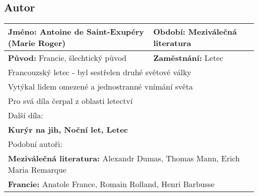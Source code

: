 \subsection*{Autor}
\begin{tabularx}{\linewidth}{l|l}
    \textbf{Jméno:} Antoine de Saint-Exupéry (Marie Roger) & \textbf{Období:} Meziválečná literatura       \\
    \hline
    \textbf{Původ:} Francie, šlechtický původ              & \textbf{Zaměstnání:} Letec                    \\
    \hline
    \multicolumn{2}{l}{Francouzský letec - byl sestřelen druhé světové války}                              \\
    \multicolumn{2}{l}{Vytýkal lidem omezené a jednostranné vnímání světa}                                 \\
    \multicolumn{2}{l}{Pro svá díla čerpal z oblasti letectví}                                             \\
    \hline
    \multicolumn{2}{l}{Další díla:}                                                                        \\
    \multicolumn{2}{l}{\textbf{Kurýr na jih, Noční let, Letec}}                                            \\
    \hline
    \multicolumn{2}{l}{Podobní autoři:}                                                                    \\
    \multicolumn{2}{l}{\textbf{Meziválečná literatura:} Alexandr Dumas, Thomas Mann, Erich Maria Remarque} \\
    \multicolumn{2}{l}{\textbf{Francie:} Anatole France, Romain Rolland, Henri Barbusse}                   \\
\end{tabularx}

